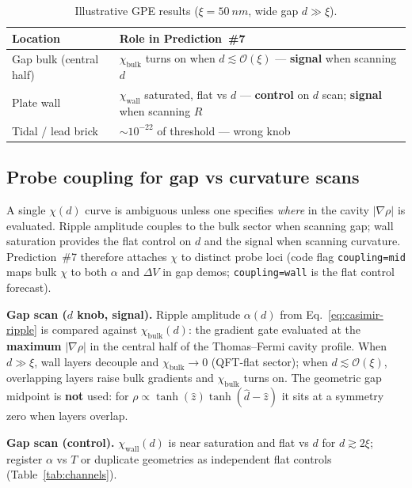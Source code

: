 \documentclass[11pt,a4paper]{article}
\begin{document}
\begin{table}[htbp]
  \centering
  \caption{Illustrative GPE results ($\xi = \SI{50}{nm}$, wide gap $d \gg \xi$).}
  \label{tab:gpe}
  \begin{tabular}{@{}ll@{}}
    \toprule
    Location & Role in Prediction~\#7 \\
    \midrule
    Gap bulk (central half) & $\chi_{\mathrm{bulk}}$ turns on when $d \lesssim \mathcal{O}(\xi)$ --- \textbf{signal} when scanning $d$ \\
    Plate wall & $\chi_{\mathrm{wall}}$ saturated, flat vs $d$ --- \textbf{control} on $d$ scan; \textbf{signal} when scanning $R$ \\
    Tidal / lead brick & $\sim 10^{-22}$ of threshold --- wrong knob \\
    \bottomrule
  \end{tabular}
\end{table}

\subsection{Probe coupling for gap vs curvature scans}
\label{sec:probe-coupling}

A single $\chi(d)$ curve is ambiguous unless one specifies \emph{where} in the cavity $|\nabla\rho|$ is evaluated.
Ripple amplitude couples to the bulk sector when scanning gap; wall saturation provides the flat control on $d$ and the signal when scanning curvature.
Prediction~\#7 therefore attaches $\chi$ to distinct probe loci (code flag \texttt{coupling=mid} maps bulk $\chi$ to both $\alpha$ and $\Delta V$ in gap demos; \texttt{coupling=wall} is the flat control forecast).

\textbf{Gap scan ($d$ knob, signal).}
Ripple amplitude $\alpha(d)$ from Eq.~\ref{eq:casimir-ripple} is compared against $\chi_{\mathrm{bulk}}(d)$: the gradient gate evaluated at the \textbf{maximum} $|\nabla\rho|$ in the central half of the Thomas--Fermi cavity profile.
When $d \gg \xi$, wall layers decouple and $\chi_{\mathrm{bulk}} \to 0$ (QFT-flat sector); when $d \lesssim \mathcal{O}(\xi)$, overlapping layers raise bulk gradients and $\chi_{\mathrm{bulk}}$ turns on.
The geometric gap midpoint is \textbf{not} used: for $\rho \propto \tanh(\hat{z})\tanh(\hat{d}-\hat{z})$ it sits at a symmetry zero when layers overlap.

\textbf{Gap scan (control).}
$\chi_{\mathrm{wall}}(d)$ is near saturation and flat vs $d$ for $d \gtrsim 2\xi$; register $\alpha$ vs $T$ or duplicate geometries as independent flat controls (Table~\ref{tab:channels}).
\end{document}
